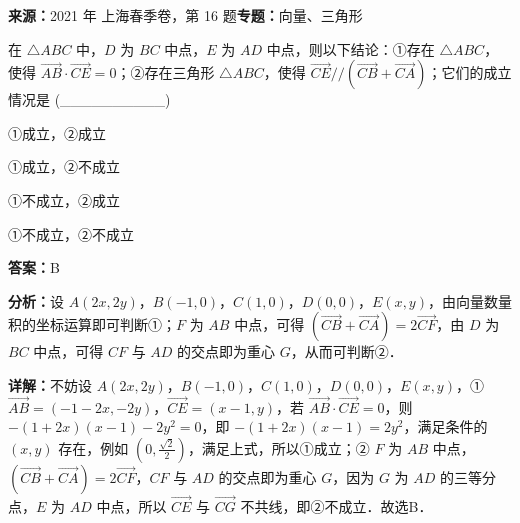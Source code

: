 \begin{question}[points=5]
\textbf{来源：}2021 年 上海春季卷，第 16 题\quad \textbf{专题：}向量、三角形\par
在 $\triangle ABC$ 中，$D$ 为 $BC$ 中点，$E$ 为 $AD$ 中点，则以下结论：①存在 $\triangle ABC$，使得 $\overrightarrow{AB}\cdot\overrightarrow{CE}=0$；②存在三角形 $\triangle ABC$，使得 $\overrightarrow{CE}//(\overrightarrow{CB}+\overrightarrow{CA})$；它们的成立情况是 (\_\_\_\_\_\_\_\_\_\_)
\begin{choices}
  \item ①成立，②成立
  \item ①成立，②不成立
  \item ①不成立，②成立
  \item ①不成立，②不成立
\end{choices}
\begin{solution}
\textbf{答案：}B

\textbf{分析：}设 $A(2x,2y)$，$B(-1,0)$，$C(1,0)$，$D(0,0)$，$E(x,y)$，由向量数量积的坐标运算即可判断①；$F$ 为 $AB$ 中点，可得 $(\overrightarrow{CB}+\overrightarrow{CA})=2\overrightarrow{CF}$，由 $D$ 为 $BC$ 中点，可得 $CF$ 与 $AD$ 的交点即为重心 $G$，从而可判断②．

\textbf{详解：}不妨设 $A(2x,2y)$，$B(-1,0)$，$C(1,0)$，$D(0,0)$，$E(x,y)$，① $\overrightarrow{AB}=(-1-2x,-2y)$，$\overrightarrow{CE}=(x-1,y)$，若 $\overrightarrow{AB}\cdot\overrightarrow{CE}=0$，则 $-(1+2x)(x-1)-2y^2=0$，即 $-(1+2x)(x-1)=2y^2$，满足条件的 $(x,y)$ 存在，例如 $(0,\frac{\sqrt{2}}{2})$，满足上式，所以①成立；② $F$ 为 $AB$ 中点，$(\overrightarrow{CB}+\overrightarrow{CA})=2\overrightarrow{CF}$，$CF$ 与 $AD$ 的交点即为重心 $G$，因为 $G$ 为 $AD$ 的三等分点，$E$ 为 $AD$ 中点，所以 $\overrightarrow{CE}$ 与 $\overrightarrow{CG}$ 不共线，即②不成立．故选B．
\end{solution}
\end{question}

